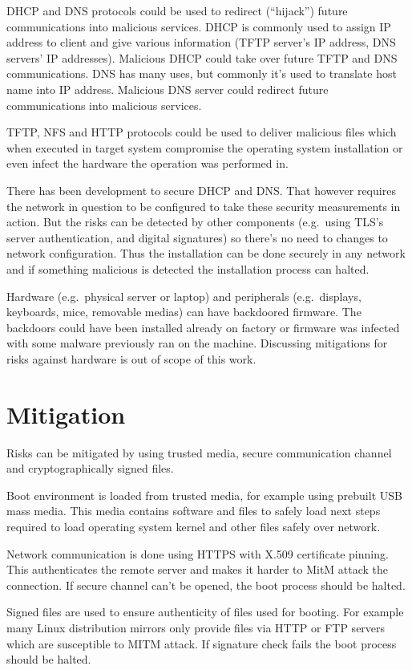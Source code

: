 DHCP and DNS protocols could be used to redirect (``hijack'') future
communications into malicious services. DHCP is commonly used to
assign IP address to client and give various information (TFTP
server's IP address, DNS servers' IP addresses). Malicious DHCP could
take over future TFTP and DNS communications. DNS has many uses, but
commonly it's used to translate host name into IP address. Malicious
DNS server could redirect future communications into malicious
services.

TFTP, NFS and HTTP protocols could be used to deliver malicious files
which when executed in target system compromise the operating system
installation or even infect the hardware the operation was performed
in.

There has been development to secure DHCP and DNS. That however
requires the network in question to be configured to take these
security measurements in action. But the risks can be detected by
other components (e.g.\ using TLS's server authentication, and digital
signatures) so there's no need to changes to network
configuration. Thus the installation can be done securely in any
network and if something malicious is detected the installation
process can halted.

Hardware (e.g.\ physical server or laptop) and peripherals (e.g.\
displays, keyboards, mice, removable medias) can have backdoored
firmware. The backdoors could have been installed already on factory
or firmware was infected with some malware previously ran on the
machine. Discussing mitigations for risks against hardware is out of
scope of this work.


\section{Mitigation}

Risks can be mitigated by using trusted media, secure communication
channel and cryptographically signed files.

Boot environment is loaded from trusted media, for example using
prebuilt USB mass media. This media contains software and files to
safely load next steps required to load operating system kernel and
other files safely over network.

Network communication is done using HTTPS with X.509 certificate
pinning. This authenticates the remote server and makes it harder to
MitM attack the connection. If secure channel can't be opened, the
boot process should be halted.

Signed files are used to ensure authenticity of files used for
booting. For example many Linux distribution mirrors only provide
files via HTTP or FTP servers which are susceptible to MITM attack. If
signature check fails the boot process should be halted.
